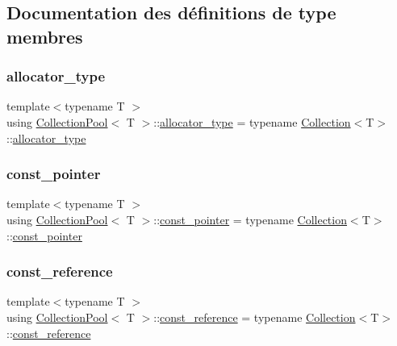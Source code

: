 \subsection{Documentation des définitions de type membres}
\mbox{\label{class_collection_pool_a2334b5af86ff5008ec9ad1ff2ea17e19}} 
\subsubsection{\texorpdfstring{allocator\+\_\+type}{allocator\_type}}
{\footnotesize\ttfamily template$<$typename T $>$ \\
using \hyperlink{class_collection_pool}{Collection\+Pool}$<$ T $>$\+::\hyperlink{class_collection_ac7974b0b552f0a94065aadc48ae53397}{allocator\+\_\+type} =  typename \hyperlink{class_collection}{Collection}$<$T$>$\+::\hyperlink{class_collection_ac7974b0b552f0a94065aadc48ae53397}{allocator\+\_\+type}}

\mbox{\label{class_collection_pool_ae1a6ed261a58f72a07c40a2cc98325d2}} 
\subsubsection{\texorpdfstring{const\+\_\+pointer}{const\_pointer}}
{\footnotesize\ttfamily template$<$typename T $>$ \\
using \hyperlink{class_collection_pool}{Collection\+Pool}$<$ T $>$\+::\hyperlink{class_collection_a79ea96d1fa145e340e907547d0053b81}{const\+\_\+pointer} =  typename \hyperlink{class_collection}{Collection}$<$T$>$\+::\hyperlink{class_collection_a79ea96d1fa145e340e907547d0053b81}{const\+\_\+pointer}}

\mbox{\label{class_collection_pool_a1861ca0a8e40abe5f8d27ec35fbc439d}} 
\subsubsection{\texorpdfstring{const\+\_\+reference}{const\_reference}}
{\footnotesize\ttfamily template$<$typename T $>$ \\
using \hyperlink{class_collection_pool}{Collection\+Pool}$<$ T $>$\+::\hyperlink{class_collection_abb8c0f6de5e322aa531837aab7358b89}{const\+\_\+reference} =  typename \hyperlink{class_collection}{Collection}$<$T$>$\+::\hyperlink{class_collection_abb8c0f6de5e322aa531837aab7358b89}{const\+\_\+reference}}

